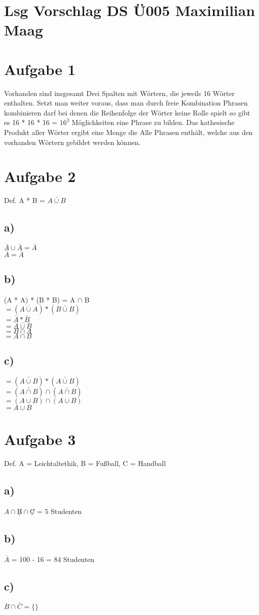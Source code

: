 \documentclass{article}
\begin{document}
	\section*{Lsg Vorschlag DS Ü005 Maximilian Maag}
	\section*{Aufgabe 1}
	Vorhanden sind insgesamt Drei Spalten mit Wörtern, die jeweils 16 Wörter enthalten. Setzt man weiter voraus, dass man durch freie Kombination Phrasen kombinieren darf bei denen die Reihenfolge der Wörter keine Rolle spielt so gibt es 16 * 16 * 16 = $16^3$ Möglichkeiten eine Phrase zu bilden. Das kathesische Produkt aller Wörter ergibt eine Menge die Alle Phrasen enthält, welche aus den vorhanden Wörtern gebildet werden können.
	\section*{Aufgabe 2}
	Def. A * B = $\bar{A \cup B}$
	\subsection*{a)}
	$\bar A \cup \bar{A} = \bar{A}$ \\
	$\bar{A} = \bar{A}$ \\
	\subsection*{b)}
	(A * A) * (B * B) = A $\cap$ B \\
	$ = (\bar{A \cup A}) * (\bar{B \cup B})$ \\
	$ = \bar{A} * \bar{B}$ \\
	$ = \bar{A} \bar{\cup} \bar{B}$ \\
	$ = B \cap A$ \\
	$ = A \cap B$ \\
	\subsection*{c)}
	$ = (\bar{A \cup B}) * (\bar{A \cup B})$ \\
	$ = (\bar{A \cap B}) \cap (\bar{A \cap B})$ \\
	$ = (A \cup B) \cap (A \cup B)$ \\
	$ = A \cup B$
	\section*{Aufgabe 3}
	Def. A = Leichtaltethik, B = Fußball,  C = Handball \\
	\subsection*{a)}
	$A \cap \not B \cap \not C$ = 5 Studenten
	\subsection*{b)}
	$\bar{A}$ = 100 - 16 = 84 Studenten
	\subsection*{c)}
	$B \cap \bar{C} = \{\}$
\end{document}
